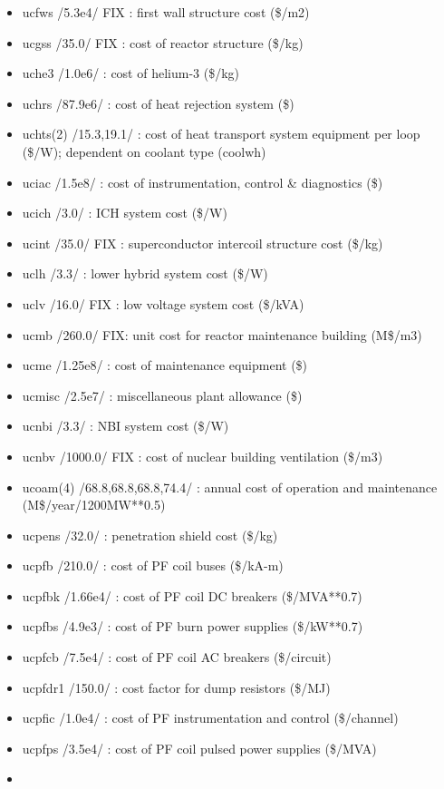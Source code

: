 \documentclass[]{article}
\begin{document}
\begin{itemize}
\item
  ucfws /5.3e4/ FIX : first wall structure cost (\$/m2)
\item
  ucgss /35.0/ FIX : cost of reactor structure (\$/kg)
\item
  uche3 /1.0e6/ : cost of helium-3 (\$/kg)
\item
  uchrs /87.9e6/ : cost of heat rejection system (\$)
\item
  uchts(2) /15.3,19.1/ : cost of heat transport system equipment per
  loop (\$/W); dependent on coolant type (coolwh)
\item
  uciac /1.5e8/ : cost of instrumentation, control \& diagnostics (\$)
\item
  ucich /3.0/ : ICH system cost (\$/W)
\item
  ucint /35.0/ FIX : superconductor intercoil structure cost (\$/kg)
\item
  uclh /3.3/ : lower hybrid system cost (\$/W)
\item
  uclv /16.0/ FIX : low voltage system cost (\$/kVA)
\item
  ucmb /260.0/ FIX: unit cost for reactor maintenance building (M\$/m3)
\item
  ucme /1.25e8/ : cost of maintenance equipment (\$)
\item
  ucmisc /2.5e7/ : miscellaneous plant allowance (\$)
\item
  ucnbi /3.3/ : NBI system cost (\$/W)
\item
  ucnbv /1000.0/ FIX : cost of nuclear building ventilation (\$/m3)
\item
  ucoam(4) /68.8,68.8,68.8,74.4/ : annual cost of operation and
  maintenance (M\$/year/1200MW**0.5)
\item
  ucpens /32.0/ : penetration shield cost (\$/kg)
\item
  ucpfb /210.0/ : cost of PF coil buses (\$/kA-m)
\item
  ucpfbk /1.66e4/ : cost of PF coil DC breakers (\$/MVA**0.7)
\item
  ucpfbs /4.9e3/ : cost of PF burn power supplies (\$/kW**0.7)
\item
  ucpfcb /7.5e4/ : cost of PF coil AC breakers (\$/circuit)
\item
  ucpfdr1 /150.0/ : cost factor for dump resistors (\$/MJ)
\item
  ucpfic /1.0e4/ : cost of PF instrumentation and control (\$/channel)
\item
  ucpfps /3.5e4/ : cost of PF coil pulsed power supplies (\$/MVA)
\item

\end{itemize}
\end{document}
